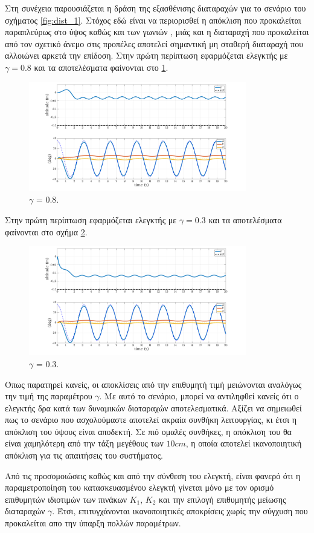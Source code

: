 Στη συνέχεια  παρουσιάζεται η δράση της εξασθένισης διαταραχών για το σενάριο 
του σχήματος \ref{fig:dist_1}. Στόχος εδώ είναι να περιορισθεί η απόκλιση που 
προκαλείται παραπλεύρως στο ύψος  καθώς και των γωνιών , μιάς 
και η διαταραχή που προκαλείται από τον σχετικό άνεμο στις προπέλες αποτελεί 
σημαντική μη σταθερή διαταραχή που αλλοιώνει αρκετά την επίδοση. Στην πρώτη 
περίπτωση εφαρμόζεται ελεγκτής με $\gamma = 0.8$ και τα αποτελέσματα φαίνονται 
στο \ref{fig:dist_80}.
\begin{figure}[H]
    \centering
    \includegraphics[width=0.85\textwidth]{Results/dist_gamma_80.png}
    \caption{$\gamma$ = 0.8.}
    \label{fig:dist_80}
\end{figure}
Στην πρώτη περίπτωση εφαρμόζεται ελεγκτής με $\gamma = 0.3$ και τα αποτελέσματα 
φαίνονται στο σχήμα \ref{fig:dist_30}.
\begin{figure}[H]
    \centering
    \includegraphics[width=0.85\textwidth]{Results/dist_gamma_30.png}
    \caption{$\gamma$ = 0.3.}
    \label{fig:dist_30}
\end{figure}
Όπως παρατηρεί κανείς, οι αποκλίσεις από την επιθυμητή τιμή μειώνονται αναλόγως 
την τιμή της παραμέτρου $\gamma$. Με αυτό το σενάριο, μπορεί να αντιληφθεί 
κανείς ότι ο ελεγκτής δρα κατά των δυναμικών διαταραχών αποτελεσματικά. Αξίζει 
να σημειωθεί πως το σενάριο που ασχολούμαστε αποτελεί ακραία συνθήκη 
λειτουργίας, κι έτσι η απόκλιση του ύψους είναι αποδεκτή. Σε πιό ομαλές 
συνθήκες, η απόκλιση του  θα είναι χαμηλότερη από την τάξη μεγέθους των 
$10 cm$, η οποία αποτελεί ικανοποιητική απόκλιση για τις απαιτήσεις του 
συστήματος.

Από τις προσομοιώσεις καθώς και από την σύνθεση του ελεγκτή, είναι φανερό ότι η
παραμετροποίηση του κατασκευασμένου ελεγκτή γίνεται μόνο με τον ορισμό 
επιθυμητών ιδιοτιμών των πινάκων $K_1, \, K_2$ και την επιλογή επιθυμητής μείωσης 
διαταραχών $\gamma$. Έτσι, επιτυγχάνονται ικανοποιητικές αποκρίσεις χωρίς την 
σύγχυση που προκαλείται απο την ύπαρξη πολλών παραμέτρων. 